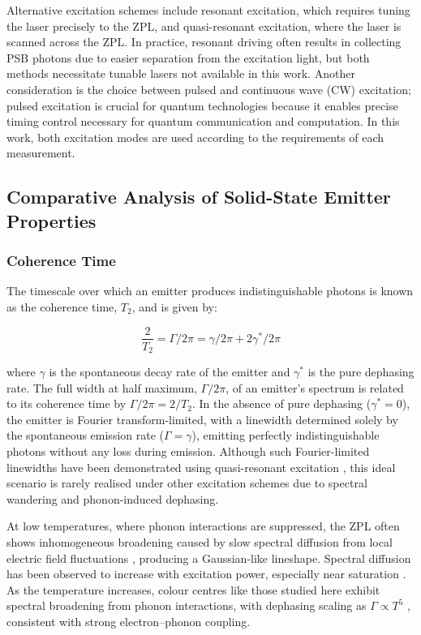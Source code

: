 Alternative excitation schemes include resonant excitation, which requires tuning the laser precisely to the ZPL, and quasi-resonant excitation, where the laser is scanned across the ZPL. In practice, resonant driving often results in collecting PSB photons due to easier separation from the excitation light, but both methods necessitate tunable lasers not available in this work. Another consideration is the choice between pulsed and continuous wave (CW) excitation; pulsed excitation is crucial for quantum technologies because it enables precise timing control necessary for quantum communication and computation. In this work, both excitation modes are used according to the requirements of each measurement.


\subsection{Comparative Analysis of Solid-State Emitter Properties}

\subsubsection{\label{sec:coherence-time} Coherence Time}

The timescale over which an emitter produces indistinguishable photons is known as the coherence time, $T_2$, and is given by:

\begin{equation}
    \frac{2}{T_2}=\Gamma/2\pi=\gamma/2\pi+2\gamma^*/2\pi
\end{equation}

where $\gamma$ is the spontaneous decay rate of the emitter and $\gamma^*$ is the pure dephasing rate. The full width at half maximum, $\Gamma/2\pi$, of an emitter’s spectrum is related to its coherence time by $\Gamma/2\pi=2/T_2$. In the absence of pure dephasing ($\gamma^*=0$), the emitter is Fourier transform-limited, with a linewidth determined solely by the spontaneous emission rate ($\Gamma=\gamma$), emitting perfectly indistinguishable photons without any loss during emission. Although such Fourier-limited linewidths have been demonstrated using quasi-resonant excitation \cite{Dietrich2018}, this ideal scenario is rarely realised under other excitation schemes due to spectral wandering and phonon-induced dephasing.

At low temperatures, where phonon interactions are suppressed, the ZPL often shows inhomogeneous broadening caused by slow spectral diffusion from local electric field fluctuations \cite{Sontheimer2017}, producing a Gaussian-like lineshape. Spectral diffusion has been observed to increase with excitation power, especially near saturation \cite{White2021}. As the temperature increases, colour centres like those studied here exhibit spectral broadening from phonon interactions, with dephasing scaling as $\Gamma \propto T^5$ \cite{Ari2025}, consistent with strong electron–phonon coupling.

